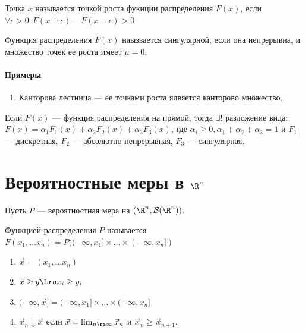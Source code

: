 \begin{definition}
    Точка \(x\) называется точкой роста фукнции распределения \(F(x)\), если \(\forall \epsilon > 0: F(x + \epsilon) - F(x - \epsilon) > 0\)
\end{definition}

\begin{definition}
    Функция распределения \(F(x)\) наызвается сингулярной, если она непрерывна, и множество точек ее роста имеет \(\mu = 0\).
\end{definition}

\paragraph{Примеры}
\begin{enumerate}
    \item Канторова лестница --- ее точками роста ялвяется канторово множество.
\end{enumerate}

\begin{theorem}
    Если \(F(x)\) --- функция распределения на прямой, тогда \(\exists !\) разложение вида: \(F(x) = \alpha_1F_1(x) + \alpha_2F_2(x) + \alpha_3F_3(x)\), где \(\alpha_i \ge 0, \alpha_1 + \alpha_2 + \alpha_3 = 1\) и \(F_1\) --- дискретная, \(F_2\) --- абсолютно непрерывная, \(F_3\) --- сингулярная.
\end{theorem}

\section{Вероятностные меры в \(\R^n\)}
Пусть \(P\) --- вероятностная мера на \((\R^n, \mathcal{B}(\R^n))\). 
\begin{definition}
    Функцией распределения \(P\) называется \(F(x_1, \dots x_n) = P((-\infty, x_1] \times \dots \times (-\infty, x_n])\)
\end{definition}

\begin{note}[Обозначения]
    \begin{enumerate}
        \item \(\vec{x} = (x_1, \dots x_n)\)
        \item \(\vec{x} \ge \vec{y} \Lra x_i \ge y_i\)
        \item \((-\infty, \vec{x}] = (-\infty, x_1] \times \dots \times (-\infty, x_n]\)
        \item \(\vec{x}_n \downarrow \vec{x}\) если \(\vec{x} = \lim_{n \ra \infty}\vec{x}_n\) и \(\vec{x}_n \ge \vec{x}_{n + 1}\).
    \end{enumerate}
\end{note}

